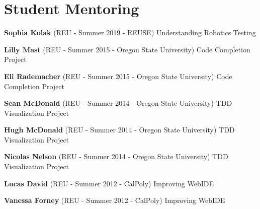 \documentclass[10pt]{article}
\begin{document}
\section{Student Mentoring}
\begin{bibsection}
\setlength\itemsep{2pt}
\item \textbf{Sophia Kolak } (REU - Summer 2019 - REUSE) Understanding Robotics Testing
\item \textbf{Lilly Mast } (REU - Summer 2015 - Oregon State University) Code Completion Project
\item \textbf{Eli Rademacher } (REU - Summer 2015 - Oregon State University) Code Completion Project
\item \textbf{Sean McDonald } (REU - Summer 2014 - Oregon State University) TDD Visualization Project
\item \textbf{Hugh McDonald } (REU - Summer 2014 - Oregon State University) TDD Visualization Project
\item \textbf{Nicolas Nelson} (REU - Summer 2014 - Oregon State University) TDD Visualization Project
\item \textbf{Lucas David} (REU - Summer 2012 - CalPoly) Improving WebIDE
\item \textbf{Vanessa Forney} (REU - Summer 2012 - CalPoly) Improving WebIDE
\end{bibsection}
\end{document}

